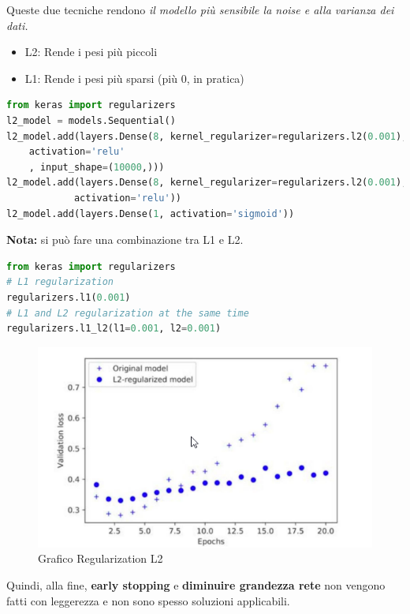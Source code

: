 Queste due tecniche rendono \textit{il modello più sensibile la noise e alla varianza dei dati.}
\begin{itemize}
    \item L2: Rende i pesi più piccoli
    \item L1: Rende i pesi più sparsi (più 0, in pratica)
\end{itemize}

\begin{lstlisting}[language=Python]
from keras import regularizers
l2_model = models.Sequential()
l2_model.add(layers.Dense(8, kernel_regularizer=regularizers.l2(0.001),
    activation='relu'
    , input_shape=(10000,)))
l2_model.add(layers.Dense(8, kernel_regularizer=regularizers.l2(0.001),
            activation='relu'))
l2_model.add(layers.Dense(1, activation='sigmoid'))
\end{lstlisting}


\textbf{Nota:} si può fare una combinazione tra L1 e L2.

\begin{lstlisting}[language=Python]
from keras import regularizers
# L1 regularization
regularizers.l1(0.001)
# L1 and L2 regularization at the same time
regularizers.l1_l2(l1=0.001, l2=0.001)
\end{lstlisting}

\begin{figure}[H]
    \centering
    \includegraphics[scale=0.5]{images/l2reg.png}
    \caption{Grafico Regularization L2}
    \label{fig:regularization}
\end{figure}

Quindi, alla fine, \textbf{early stopping} e \textbf{diminuire grandezza rete} non vengono fatti con 
leggerezza e non sono spesso soluzioni applicabili.

